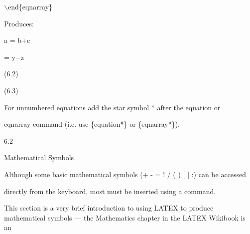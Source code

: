\documentclass[a4paper,portrait,12pt]{article}
\begin{document}
\begin{flushleft}
\ensuremath{\backslash}end\{eqnarray\}
\end{flushleft}


\begin{flushleft}
Produces:
\end{flushleft}





\begin{flushleft}
a = b+c
\end{flushleft}


\begin{flushleft}
= y$-$z
\end{flushleft}





(6.2)


(6.3)





\begin{flushleft}
For unnumbered equations add the star symbol * after the equation or
\end{flushleft}


\begin{flushleft}
eqnarray command (i.e. use \{equation*\} or \{eqnarray*\}).
\end{flushleft}





6.2





\begin{flushleft}
Mathematical Symbols
\end{flushleft}





\begin{flushleft}
Although some basic mathematical symbols (+ - = ! / ( ) [ ] :) can be accessed
\end{flushleft}


\begin{flushleft}
directly from the keyboard, most must be inserted using a command.
\end{flushleft}


\begin{flushleft}
This section is a very brief introduction to using LATEX to produce mathematical symbols --- the Mathematics chapter in the LATEX Wikibook is an
\end{flushleft}
\end{document}
